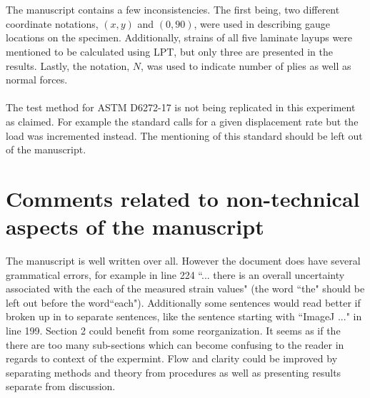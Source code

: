 \documentclass[12pt]{article}
\begin{document}
\\
\\
The manuscript contains a few inconsistencies. The first being, two different coordinate notations, $(x,y)$ and $(0,90)$, were used in describing  gauge locations on the specimen. Additionally, strains of all five laminate layups were mentioned to be calculated using LPT, but only three are presented in the results. Lastly, the notation, $N$, was used to indicate number of plies as well as normal forces.
\\
\\
The test method for ASTM D6272-17 is not being replicated in this experiment as claimed. For example the standard calls for a given displacement rate but the load was incremented instead. The mentioning of this standard should be left out of the manuscript.  
\section{Comments related to non-technical aspects of the manuscript} 
The manuscript is well written over all. However the document does have several grammatical errors, for example in line 224 ``... there is an overall uncertainty associated with the each of the measured strain values" (the word ``the" should be left out before the word``each"). Additionally some sentences would read better if broken up in to separate sentences, like the sentence starting with ``ImageJ ..." in line 199. 
Section 2 could benefit from some reorganization. It seems as if the there are too many sub-sections which can become confusing to the reader in regards to context of the expermint.  Flow and clarity could be improved by separating methods and theory from procedures as well as presenting results separate from discussion.
\end{document}
